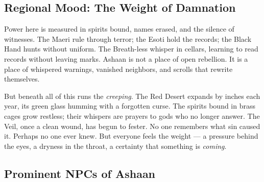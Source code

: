 \subsection*{Regional Mood: The Weight of Damnation}

Power here is measured in spirits bound, names erased, and the silence of witnesses. The Maeri rule through terror; the Esoti hold the records; the Black Hand hunts without uniform. The Breath-less whisper in cellars, learning to read records without leaving marks. Ashaan is not a place of open rebellion. It is a place of whispered warnings, vanished neighbors, and scrolls that rewrite themselves.

But beneath all of this runs the \emph{creeping}. The Red Desert expands by inches each year, its green glass humming with a forgotten curse. The spirits bound in brass cages grow restless; their whispers are prayers to gods who no longer answer. The Veil, once a clean wound, has begun to fester. No one remembers what sin caused it. Perhaps no one ever knew. But everyone feels the weight --- a pressure behind the eyes, a dryness in the throat, a certainty that something is \emph{coming}.

\subsection*{Prominent NPCs of Ashaan}
\label{sec:ashaan-npcs}

